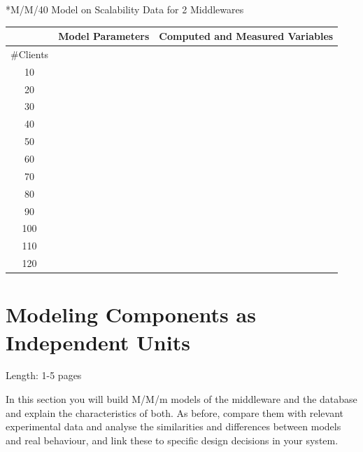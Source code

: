 \documentclass[11pt]{article}
\begin{document}
\begin{center}
	*{M/M/40 Model on Scalability Data for 2 Middlewares}
	\begin{tabular}{c|c|c||c}
		\hline
		& \multicolumn{2}{c||}{Model Parameters} & \multicolumn{1}{c}{Computed and Measured Variables} \\
		\hline
		\#Clients & & & \\
		10  & & & \\
		20 & & & \\
		30 & & & \\
		40 & & & \\
		50 & & & \\
		60 & & & \\
		70 & & & \\
		80 & & & \\
		90 & & & \\
		100 & & & \\
		110 & & & \\
		120 & & & \\
		\hline
	\end{tabular}
\end{center}

\section{Modeling Components as Independent Units}\label{sec:independent-units}

Length: 1-5 pages

In this section you will build M/M/m models of the middleware and the database and explain the characteristics of both. As before, compare them with relevant experimental data and analyse the similarities and differences between models and real behaviour, and link these to specific design decisions in your system.
\end{document}
